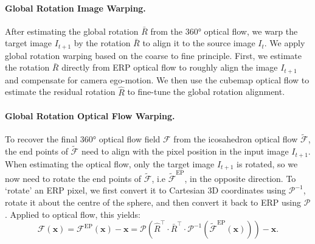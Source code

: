 \vspace{-1em}
\paragraph{Global Rotation Image Warping.}
After estimating the global rotation $\bar{R}$ from the 360° optical flow, we warp the target image $I_{t+1}$ by the rotation $\bar{R}$ to align it to the source image $I_{t}$. %
%
We apply global rotation warping based on the coarse to fine principle.
First, we estimate the rotation $\bar{R}$ directly from ERP optical flow to roughly align the image $I_{t+1}$ and compensate for camera ego-motion.
We then use the cubemap optical flow to estimate the residual rotation $\hat{R}$ to fine-tune the global rotation alignment.

\vspace{-1em}
\paragraph{Global Rotation Optical Flow Warping.}
To recover the final 360° optical flow field $\mathcal{F}$ from the icosahedron optical flow $\tilde{\mathcal{F}}$, the end points of $\tilde{\mathcal{F}}$ need to align with the pixel position in the input image $I_{t+1}$.
% 
When estimating the optical flow, only the target image $I_{t+1}$ is rotated, so we now need to rotate the end points of $\tilde{\mathcal{F}}$, i.e $\tilde{\mathcal{F}}^\text{EP}$, in the opposite direction.
%
To `rotate' an ERP pixel, we first convert it to Cartesian 3D coordinates using  $\mathcal{P}^{-1}$, rotate it about the centre of the sphere, and then convert it back to ERP  using $\mathcal{P}$.
%
Applied to optical flow, this yields:
%
\begin{equation}\label{equ:approach:globalwarp}
	\mathcal{F}(\mathbf{x})
	= \mathcal{F}^\text{EP}(\mathbf{x}) - \mathbf{x}
	= \mathcal{P} \left( \hat{R}^\top \cdot \bar{R}^\top \cdot \mathcal{P}^{-1}(\tilde{\mathcal{F}}^\text{EP}(\mathbf{x}))\right)  - \mathbf{x}
	\text{.}
\end{equation}

